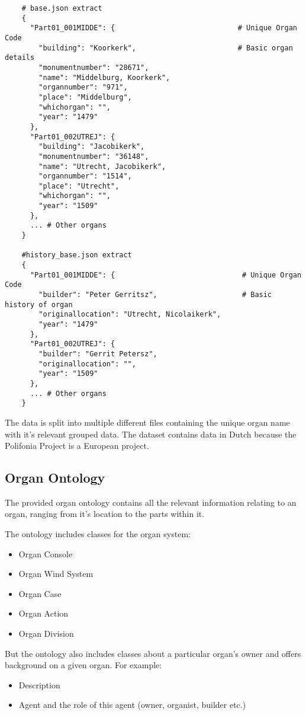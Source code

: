 \begin{lstlisting}
    # base.json extract
    {
      "Part01_001MIDDE": {                             # Unique Organ Code
        "building": "Koorkerk",                        # Basic organ details
        "monumentnumber": "28671",
        "name": "Middelburg, Koorkerk",
        "organnumber": "971",
        "place": "Middelburg",
        "whichorgan": "",
        "year": "1479"
      },
      "Part01_002UTREJ": {
        "building": "Jacobikerk",
        "monumentnumber": "36148",
        "name": "Utrecht, Jacobikerk",
        "organnumber": "1514",
        "place": "Utrecht",
        "whichorgan": "",
        "year": "1509"
      },
      ... # Other organs
    }

    #history_base.json extract
    {
      "Part01_001MIDDE": {                              # Unique Organ Code
        "builder": "Peter Gerritsz",                    # Basic history of organ
        "originallocation": "Utrecht, Nicolaikerk",
        "year": "1479"
      },
      "Part01_002UTREJ": {
        "builder": "Gerrit Petersz",
        "originallocation": "",
        "year": "1509"
      },
      ... # Other organs
    }
\end{lstlisting}

The data is split into multiple different files containing the unique organ name with it's relevant grouped data. The dataset contains data in Dutch because the Polifonia Project is a European project.

\subsection{Organ Ontology}
\hspace{0.5cm} The provided organ ontology contains all the relevant information relating to an organ, ranging from it's location to the parts within it. 

The ontology includes classes for the organ system:
\begin{itemize}
\item Organ Console
\item Organ Wind System
\item Organ Case
\item Organ Action
\item Organ Division
\end{itemize}

But the ontology also includes classes about a particular organ's owner and offers background on a given organ. For example:
\begin{itemize}
\item Description
\item Agent and the role of this agent (owner, organist, builder etc.)
\end{itemize}

